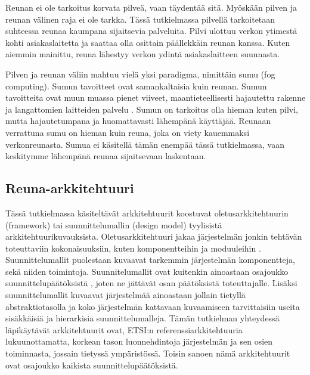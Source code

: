 Reunan ei ole tarkoitus korvata pilveä, vaan täydentää sitä. Myöskään pilven ja reunan välinen raja ei ole tarkka. Tässä tutkielmassa pilvellä tarkoitetaan suhteessa reunaa kaumpana sijaitsevia palveluita. Pilvi ulottuu verkon ytimestä kohti asiakaslaitetta ja saattaa olla osittain päällekkäin reunan kanssa. Kuten aiemmin mainittu, reuna lähestyy verkon ydintä asiakaslaitteen suunnasta. 

Pilven ja reunan väliin mahtuu vielä yksi paradigma, nimittäin sumu (fog computing).
Sumun tavoitteet ovat samankaltaisia kuin reunan. Sumun tavoitteita ovat muun muassa pienet viiveet, maantieteellisesti hajautettu rakenne ja langattomien laitteiden palvelu \cite{bonomi2012fog}. Sumun on tarkoitus olla hieman kuten pilvi, mutta hajautetumpana ja huomattavasti lähempänä käyttäjää. Reunaan verrattuna sumu on hieman kuin reuna, joka on viety kauemmaksi verkonreunasta. Sumua ei käsitellä tämän enempää tässä tutkielmassa, vaan keskitymme lähempänä reunaa sijaitsevaan laskentaan.






\subsection{Reuna-arkkitehtuuri}


Tässä tutkielmassa käsiteltävät arkkitehtuurit koostuvat oletusarkkitehtuurin (framework) tai suunnittelumallin (design model) tyylisistä arkkitehtuurikuvauksista. 
Oletusarkkitehtuuri jakaa järjestelmän jonkin tehtävän toteuttaviin kokonaisuuksiin, kuten komponentteihin ja moduuleihin \cite{ohark}. 
Suunnittelumallit puolestaan kuvaavat tarkemmin järjestelmän komponentteja, sekä niiden toimintoja. Suunnitelumallit ovat kuitenkin ainoastaan osajoukko suunnittelupäätöksistä \cite{ohark2}, joten ne jättävät osan päätöksistä toteuttajalle. Lisäksi suunnittelumallit kuvaavat järjestelmää ainoastaan jollain tietyllä abstraktiotasolla ja koko järjestelmän kattavaan kuvaamiseen tarvittaisiin useita sisäkkäisiä ja hierarkisia suunnittelumalleja. Tämän tutkielman yhteydessä läpikäytävät arkkitehtuurit ovat, ETSI:n referenssiarkkitehtuuria \cite{etsirefarch} lukuunottamatta, korkean tason luonnehdintoja järjestelmän ja sen osien toiminnasta, jossain tietyssä ympäristössä. Toisin sanoen nämä arkkitehtuurit ovat osajoukko kaikista suunnittelupäätöksistä.
 
